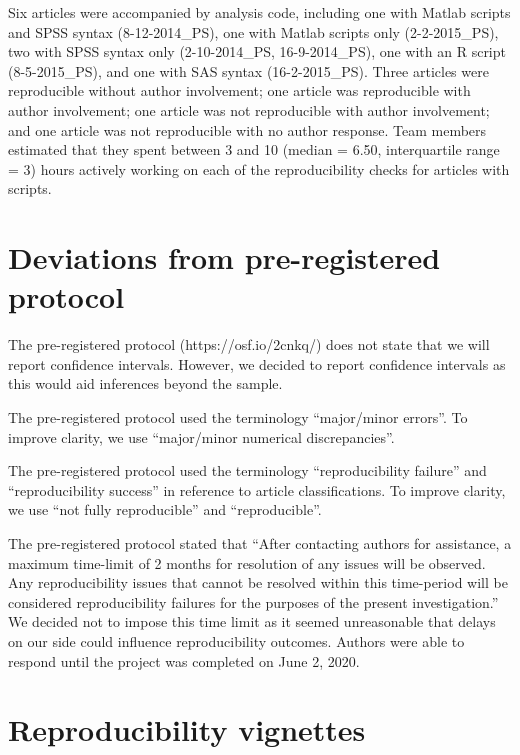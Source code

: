 \begin{appendix}
Six articles were accompanied by analysis code, including one with
Matlab scripts and SPSS syntax (8-12-2014\_PS), one with Matlab scripts
only (2-2-2015\_PS), two with SPSS syntax only (2-10-2014\_PS,
16-9-2014\_PS), one with an R script (8-5-2015\_PS), and one with SAS
syntax (16-2-2015\_PS). Three articles were reproducible without author
involvement; one article was reproducible with author involvement; one
article was not reproducible with author involvement; and one article
was not reproducible with no author response. Team members estimated
that they spent between 3 and 10 (median = 6.50, interquartile range =
3) hours actively working on each of the reproducibility checks for
articles with scripts.

\hypertarget{prereg}{%
\section{Deviations from pre-registered protocol}\label{prereg}}

The pre-registered protocol (https://osf.io/2cnkq/) does not state that
we will report confidence intervals. However, we decided to report
confidence intervals as this would aid inferences beyond the sample.

The pre-registered protocol used the terminology ``major/minor errors''.
To improve clarity, we use ``major/minor numerical discrepancies''.

The pre-registered protocol used the terminology ``reproducibility
failure'' and ``reproducibility success'' in reference to article
classifications. To improve clarity, we use ``not fully reproducible''
and ``reproducible''.

The pre-registered protocol stated that ``After contacting authors for
assistance, a maximum time-limit of 2 months for resolution of any
issues will be observed. Any reproducibility issues that cannot be
resolved within this time-period will be considered reproducibility
failures for the purposes of the present investigation.'' We decided not
to impose this time limit as it seemed unreasonable that delays on our
side could influence reproducibility outcomes. Authors were able to
respond until the project was completed on June 2, 2020.

\hypertarget{vignettes}{%
\section{Reproducibility vignettes}\label{vignettes}}


\end{appendix}
